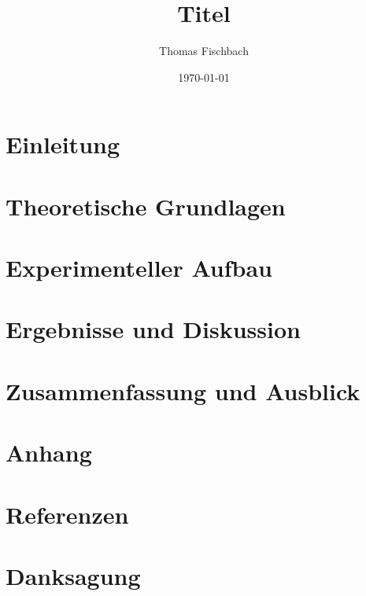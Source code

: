\documentclass[a4paper,12pt]{article}
\begin{document}
\title{\vspace{30mm} \bf{Titel}}
\author{Thomas Fischbach}
\date{\today}
\maketitle

\vfill
  
  
  
  
\tableofcontents  
  
\newpage
  
\section{Einleitung}

\section{Theoretische Grundlagen}

\section{Experimenteller Aufbau}

\section{Ergebnisse und Diskussion}

\section{Zusammenfassung und Ausblick}

\section{Anhang}

\section{Referenzen}

\section{Danksagung}

  
\end{document}
